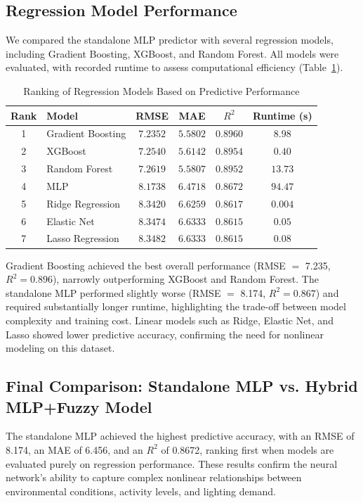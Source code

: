 \documentclass[conference]{IEEEtran}
\begin{document}
\subsection{Regression Model Performance}

We compared the standalone MLP predictor with several regression models, including Gradient Boosting, XGBoost, and Random Forest. All models were evaluated, with recorded runtime to assess computational efficiency (Table~\ref{tab:model_ranking}).

\begin{table}[H]
\centering
\caption{Ranking of Regression Models Based on Predictive Performance}
\label{tab:model_ranking}
\begin{tabular}{c|l|c|c|c|c}
\hline
\textbf{Rank} & \textbf{Model} & \textbf{RMSE} & \textbf{MAE} & \textbf{$R^2$} & \textbf{Runtime (s)} \\
\hline
1 & Gradient Boosting & \textbf{$7.2352$} & \textbf{$5.5802$} & \textbf{$0.8960$} & $8.98$ \\
2 & XGBoost & $7.2540$ & $5.6142$ & $0.8954$ & $0.40$\\
3 & Random Forest & $7.2619$ & $5.5807$ & $0.8952$ & $13.73$\\
4 & MLP & $8.1738$ & $6.4718$ & $0.8672$ & $94.47$ \\
5 & Ridge Regression & $8.3420$ & $6.6259$ & $0.8617$ & $0.004$\\
6 & Elastic Net & $8.3474$ & $6.6333$ & $0.8615$ & $0.05$\\
7 & Lasso Regression & $8.3482$ & $6.6333$ & $0.8615$ & $0.08$\\
\hline
\end{tabular}
\end{table}

Gradient Boosting achieved the best overall performance (RMSE $=$ 7.235, $R^2 = 0.896$), narrowly outperforming XGBoost and Random Forest. The standalone MLP performed slightly worse (RMSE $=$ 8.174, $R^2 = 0.867$) and required substantially longer runtime, highlighting the trade-off between model complexity and training cost. Linear models such as Ridge, Elastic Net, and Lasso showed lower predictive accuracy, confirming the need for nonlinear modeling on this dataset.

\subsection{Final Comparison: Standalone MLP vs. Hybrid MLP+Fuzzy Model}
The standalone MLP achieved the highest predictive accuracy, with an RMSE of 8.174, an MAE of 6.456, and an $R^2$ of 0.8672, ranking first when models are evaluated purely on regression performance. These results confirm the neural network’s ability to capture complex nonlinear relationships between environmental conditions, activity levels, and lighting demand.
\end{document}
